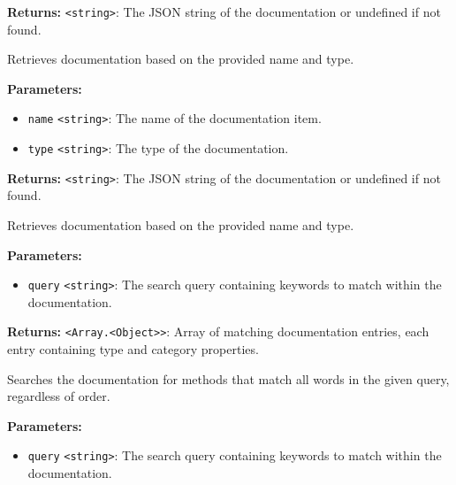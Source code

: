 \documentclass[12pt,a4paper]{article}
\begin{document}
\noindent \textbf{Returns:} \texttt{<string>}: The JSON string of the documentation or undefined if not found.

\noindent Retrieves documentation based on the provided name and type.

\vspace{5mm}
\noindent {}


\noindent \textbf{Parameters:}
\begin{itemize}
  \item \texttt{name} \texttt{<string>}: The name of the documentation item.
  \item \texttt{type} \texttt{<string>}: The type of the documentation.
\end{itemize}

\noindent \textbf{Returns:} \texttt{<string>}: The JSON string of the documentation or undefined if not found.

\noindent Retrieves documentation based on the provided name and type.

\vspace{5mm}
\noindent {}


\noindent \textbf{Parameters:}
\begin{itemize}
  \item \texttt{query} \texttt{<string>}: The search query containing keywords to match within the documentation.
\end{itemize}

\noindent \textbf{Returns:} \texttt{<Array.<Object>>}: Array of matching documentation entries, each entry containing \textasciigrave{}type\textasciigrave{} and \textasciigrave{}category\textasciigrave{} properties.

\noindent Searches the documentation for methods that match all words in the given query, regardless of order.

\vspace{5mm}
\noindent {}


\noindent \textbf{Parameters:}
\begin{itemize}
  \item \texttt{query} \texttt{<string>}: The search query containing keywords to match within the documentation.
\end{itemize}
\end{document}
